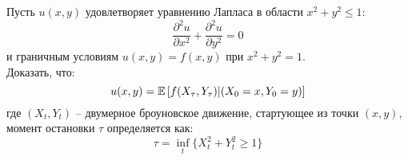 \documentclass[12pt]{article}
\begin{document}
\begin{problem}
    Пусть $u(x, y)$ удовлетворяет уравнению Лапласа в области $x^2+y^2 \leq 1$:
    $$
        \dfrac{\partial^2 u}{\partial x^2} + \dfrac{\partial^2 u}{\partial y^2} = 0 
    $$и граничным условиям $u(x, y) = f(x, y)$ при $x^2+y^2=1$. 
    \\ Доказать, что:
    $$
        u(x, y) = \mathbb{E} \left[f(X_{\tau}, Y_{\tau}) | (X_0 = x, Y_0 = y)\right]
    $$где $(X_t, Y_t)$ -- двумерное броуновское движение, стартующее из точки $(x, y)$, момент остановки $\tau$ определяется как:
    $$
        \tau = \inf_{t} \{ X_t^2 + Y_t^2 \geq 1 \}
    $$
\end{problem}
\end{document}
